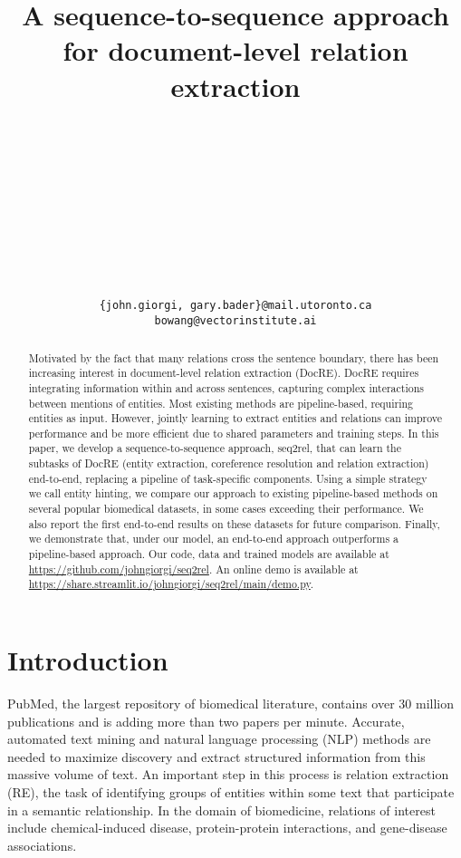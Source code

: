 \documentclass[11pt]{article}
\title{A sequence-to-sequence approach for document-level relation extraction}
\author{
   \\
  \\
   \\
   \\
   \\
   \\
   \\
   \\
   \\
   \\
  \texttt{\{john.giorgi, gary.bader\}@mail.utoronto.ca} \\
  \texttt{bowang@vectorinstitute.ai}\\}
\begin{document}
\maketitle
\begin{abstract}
Motivated by the fact that many relations cross the sentence boundary, there has been increasing interest in document-level relation extraction (DocRE). DocRE requires integrating information within and across sentences, capturing complex interactions between mentions of entities. Most existing methods are pipeline-based, requiring entities as input. However, jointly learning to extract entities and relations can improve performance and be more efficient due to shared parameters and training steps. In this paper, we develop a sequence-to-sequence approach, seq2rel, that can learn the subtasks of DocRE (entity extraction, coreference resolution and relation extraction) end-to-end, replacing a pipeline of task-specific components. Using a simple strategy we call entity hinting, we compare our approach to existing pipeline-based methods on several popular biomedical datasets, in some cases exceeding their performance. We also report the first end-to-end results on these datasets for future comparison. Finally, we demonstrate that, under our model, an end-to-end approach outperforms a pipeline-based approach. Our code, data and trained models are available at {\small{\url{https://github.com/johngiorgi/seq2rel}}}. An online demo is available at {\small{\url{https://share.streamlit.io/johngiorgi/seq2rel/main/demo.py}}}.
\end{abstract}

\section{Introduction}



PubMed, the largest repository of biomedical literature, contains over 30 million publications and is adding more than two papers per minute. Accurate, automated text mining and natural language processing (NLP) methods are needed to maximize discovery and extract structured information from this massive volume of text. An important step in this process is relation extraction (RE), the task of identifying groups of entities within some text that participate in a semantic relationship. In the domain of biomedicine, relations of interest include chemical-induced disease, protein-protein interactions, and gene-disease associations.
\end{document}
